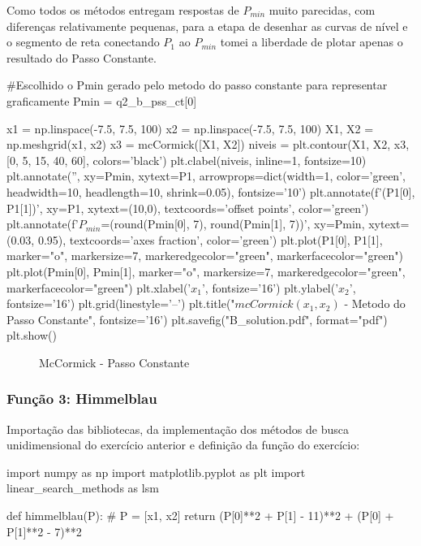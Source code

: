 \documentclass[10pt, a4paper]{article}
\begin{document}
Como todos os métodos entregam respostas de $P_{min}$ muito parecidas, com diferenças relativamente pequenas,
para a etapa de desenhar as curvas de nível e o segmento de reta conectando $P_1$ ao $P_{min}$ tomei a liberdade
de plotar apenas o resultado do Passo Constante.

\begin{python}
  #Escolhido o Pmin gerado pelo metodo do passo constante para representar graficamente
  Pmin = q2_b_pss_ct[0]

  x1 = np.linspace(-7.5, 7.5, 100)
  x2 = np.linspace(-7.5, 7.5, 100)
  X1, X2 = np.meshgrid(x1, x2)
  x3 = mcCormick([X1, X2])
  niveis = plt.contour(X1, X2, x3, [0, 5, 15, 40, 60], colors='black')
  plt.clabel(niveis, inline=1, fontsize=10)
  plt.annotate('', xy=Pmin, xytext=P1,
                  arrowprops=dict(width=1, color='green', headwidth=10, headlength=10, shrink=0.05), fontsize='10')
  plt.annotate(f'({P1[0]}, {P1[1]})', xy=P1, xytext=(10,0), textcoords='offset points', color='green')
  plt.annotate(f'$P_{{min}}$=({round(Pmin[0], 7)}, {round(Pmin[1], 7)})', xy=Pmin, xytext=(0.03, 0.95), textcoords='axes fraction', color='green')
  plt.plot(P1[0], P1[1], marker="o", markersize=7, markeredgecolor="green", markerfacecolor="green")
  plt.plot(Pmin[0], Pmin[1], marker="o", markersize=7, markeredgecolor="green", markerfacecolor="green")
  plt.xlabel('$x_1$', fontsize='16')
  plt.ylabel('$x_2$', fontsize='16')
  plt.grid(linestyle='--')
  plt.title("$mcCormick(x_1, x_2)$ - Metodo do Passo Constante", fontsize='16')
  plt.savefig("B_solution.pdf", format="pdf")
  plt.show()
\end{python}

\begin{figure}[htpb]
  \centering
  \caption{McCormick - Passo Constante}
  \label{fig:q2b}
\end{figure}





\subsubsection{Função 3: Himmelblau}

Importação das bibliotecas, da implementação dos métodos de busca unidimensional do exercício anterior e
definição da função do exercício:

\begin{python}
  import numpy as np
  import matplotlib.pyplot as plt
  import linear_search_methods as lsm

  def himmelblau(P):
    # P = [x1, x2]
    return (P[0]**2 + P[1] - 11)**2 + (P[0] + P[1]**2 - 7)**2
\end{python}
\end{document}
